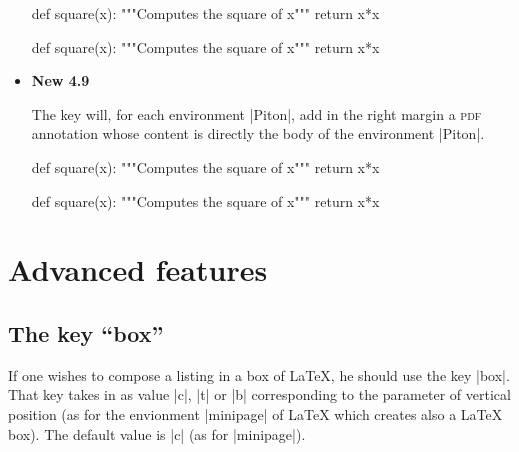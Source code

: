 \documentclass{article}
\begin{document}
\begin{itemize}
\medskip
\begin{Code}
\begin{Piton}[\emph{paperclip},background-color=gray!15]
def square(x):
    """Computes the square of x"""
    return x*x
\end{Piton}    
\end{Code}

\medskip
\begin{Piton}[paperclip,background-color=gray!15]
def square(x):
    """Computes the square of x"""
    return x*x
\end{Piton}    


\item {}
\colorbox{yellow!50}{\textbf{New 4.9}}

\nobreak
The key  will, for each environment |{Piton}|, add in the right
margin a \textsc{pdf} annotation whose content is directly the body of the
environment |{Piton}|.

\medskip
\begin{Code}
\begin{Piton}[\emph{annotation},background-color=gray!15]
def square(x):
    """Computes the square of x"""
    return x*x
\end{Piton}    
\end{Code}

\medskip
\begin{Piton}[annotation,background-color=gray!15]
def square(x):
    """Computes the square of x"""
    return x*x
\end{Piton}    


\end{itemize}

\section{Advanced features}

\subsection{The key ``box''}

\label{box}

If one wishes to compose a listing in a box of LaTeX, he should use the key
|box|. That key takes in as value |c|, |t| or |b| corresponding to the parameter
of vertical position (as for the envionment |{minipage}| of LaTeX which creates also
a LaTeX box). The default value is |c| (as for |{minipage}|).
\end{document}
